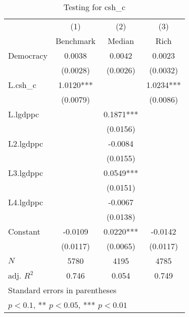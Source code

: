 \begin{table}[htbp]\centering
\def\sym#1{\ifmmode^{#1}\else\(^{#1}\)\fi}
\caption{Testing for csh\_c \label{tab:regression1}}
\begin{tabular}{l*{3}{c}}
\hline\hline
            &\multicolumn{1}{c}{(1)}&\multicolumn{1}{c}{(2)}&\multicolumn{1}{c}{(3)}\\
            &\multicolumn{1}{c}{Benchmark}&\multicolumn{1}{c}{Median}&\multicolumn{1}{c}{Rich}\\
\hline
Democracy   &      0.0038   &      0.0042   &      0.0023   \\
            &    (0.0028)   &    (0.0026)   &    (0.0032)   \\
[1em]
L.csh\_c     &      1.0120***&               &      1.0234***\\
            &    (0.0079)   &               &    (0.0086)   \\
[1em]
L.lgdppc    &               &      0.1871***&               \\
            &               &    (0.0156)   &               \\
[1em]
L2.lgdppc   &               &     -0.0084   &               \\
            &               &    (0.0155)   &               \\
[1em]
L3.lgdppc   &               &      0.0549***&               \\
            &               &    (0.0151)   &               \\
[1em]
L4.lgdppc   &               &     -0.0067   &               \\
            &               &    (0.0138)   &               \\
[1em]
Constant    &     -0.0109   &      0.0220***&     -0.0142   \\
            &    (0.0117)   &    (0.0065)   &    (0.0117)   \\
\hline
\(N\)       &        5780   &        4195   &        4785   \\
adj. \(R^{2}\)&       0.746   &       0.054   &       0.749   \\
\hline\hline
\multicolumn{4}{l}{\footnotesize Standard errors in parentheses}\\
\multicolumn{4}{l}{\footnotesize * \(p<0.1\), ** \(p<0.05\), *** \(p<0.01\)}\\
\end{tabular}
\end{table}
